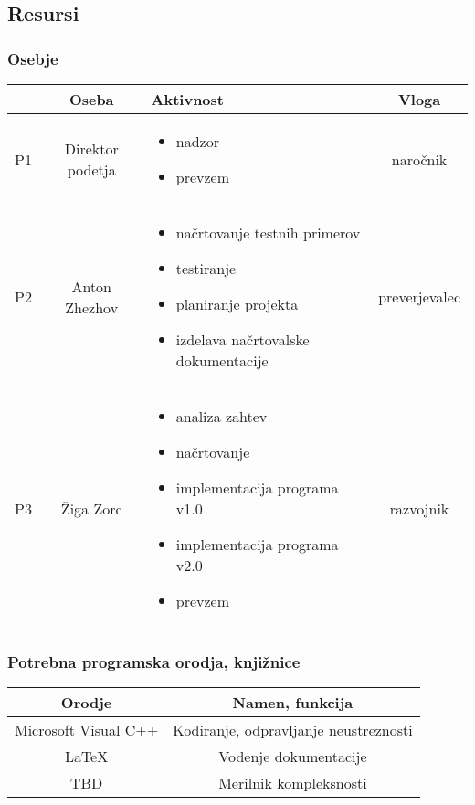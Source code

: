 \documentclass[a4paper,12pt]{article}
\begin{document}
\newpage

	\subsection{Resursi}

		\subsubsection{Osebje}
			\begin{center}
			\begin{tabular}{|c|c|>{\centering}m{}|c|}
				\hline
				&Oseba&Aktivnost&Vloga\\
				\hline
			  P1&Direktor podetja&
			\begin{itemize}
				\item nadzor
				\item prevzem
			\end{itemize}&naročnik\\
				\hline
			  P2&Anton Zhezhov&
				\begin{itemize}
					\item načrtovanje testnih primerov
					\item testiranje
					\item planiranje projekta
					\item izdelava načrtovalske dokumentacije
				\end{itemize}&preverjevalec\\
				\hline
			  P3&Žiga Zorc&
				\begin{itemize}
					\item analiza zahtev
					\item načrtovanje
					\item implementacija programa v1.0
					\item implementacija programa v2.0
					\item prevzem
				\end{itemize}&razvojnik\\
				\hline
			\end{tabular}
			\end{center}
		
		\subsubsection{Potrebna programska orodja, knjižnice}
			\begin{center}
			\begin{tabular}{|c|c|}
					\hline
					\rowcolor{purple!30!} Orodje& Namen, funkcija\\
					\hline
					Microsoft Visual C++& Kodiranje, odpravljanje neustreznosti\\
					\hline
					\LaTeX &Vodenje dokumentacije\\
					\hline
					TBD& Merilnik kompleksnosti\\
					\hline
			\end{tabular}
			\end{center}
\end{document}
